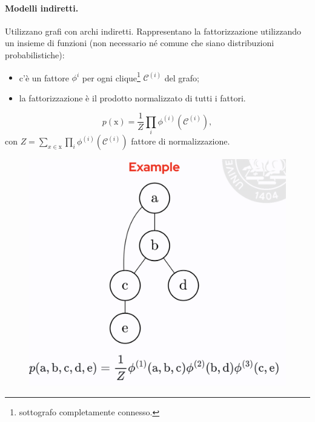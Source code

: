 \paragraph{Modelli indiretti.} Utilizzano grafi con archi indiretti. Rappresentano la fattorizzazione utilizzando un insieme di funzioni (non necessario né comune che siano distribuzioni probabilistiche):
\begin{itemize}
    \item c'è un fattore $\phi^{i}$ per ogni clique\footnote{sottografo completamente connesso.} $\mathcal{C}^{(i)}$ del grafo;
    \item la fattorizzazione è il prodotto normalizzato di tutti i fattori.
\end{itemize}
\begin{equation}
    p(\text{x})=\frac{1}{Z}\prod_i\phi^{(i)}(\mathcal{C}^{(i)}),
\end{equation}
con $Z=\sum_{x\in\text{x}}\prod_i\phi^{(i)}(\mathcal{C}^{(i)})$ fattore di normalizzazione.
\begin{figure}[!h]
    \includegraphics[scale=.5]{images/prerequisites/graphModelUnd.png}
    \centering
\end{figure}
\newpage